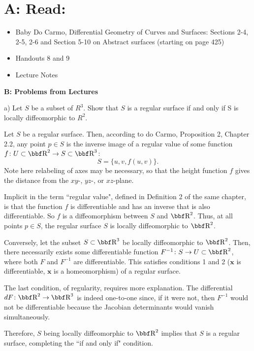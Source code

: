 \documentclass[10pt,letterpaper]{hmcpset}
\begin{document}
\section*{A: Read: } 

\begin{itemize}
\item{Baby Do Carmo, Differential Geometry
    of Curves and Surfaces:  
Sections 2-4, 2-5, 2-6 and Section 5-10 on Abstract surfaces (starting 
on page 425)} 
\item{Handouts 8 and 9}
\item{Lecture Notes}
\end{itemize}

\textbf{B: Problems from Lectures}


\begin{problem}
a) Let $S$ be a subset of $R^3$.  Show that $S$ is a
regular surface if and only if S is locally diffeomorphic 
to $R^2$.
\end{problem}
\begin{solution}
Let $S$ be a regular surface. Then, according to do Carmo, Proposition 2, Chapter 2.2, any point $p \in S$ is the inverse image of a regular value of some function $f \colon U \subset \RR^2 \to S \subset \RR^3$:
\[
S = \{u, v, f(u,v) \}.
\]
Note here relabeling of axes may be necessary, so that the height function $f$ gives the distance from the $xy$-, $yz$-, or $xz$-plane.

Implicit in the term ``regular value", defined in Definition 2 of the same
chapter, is that the function $f$ is differentiable and has an inverse that is
also differentiable. So $f$ is a diffeomorphism between $S$ and $\RR^2$. Thus, at all points $p \in S$, the regular surface $S$ is locally diffeomorphic to $\RR^2$.

Conversely, let the subset $S \subset \RR^3$ be locally diffeomorphic to $\RR^2$. Then, there necessarily exists some differentiable function $F^{-1} \colon S \to U \subset \RR^2$, where both $F$ and $F^{-1}$ are differentiable. This satisfies conditions 1 and 2 ($\mathbf{x}$ is differentiable, $\mathbf{x}$ is a homeomorphism)  of a regular surface. 

The last condition, of regularity, requires more explanation. The differential $dF \colon \RR^2 \to \RR^3$ is indeed one-to-one since, if it were not, then $F^{-1}$ would not be differentiable because the Jacobian determinants would vanish simultaneously. 

Therefore, $S$ being locally diffeomorphic to $\RR^2$ implies that $S$ is a regular surface, completing the ``if and only if" condition.

\end{solution}
\end{document}
